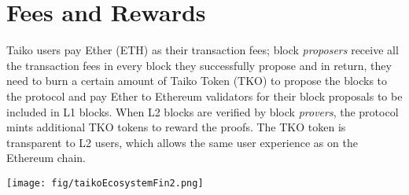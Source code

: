\section{Fees and Rewards}\label{sec:tokenomics}

Taiko users pay Ether (ETH) as their transaction fees; block \emph{proposers} receive all the transaction fees in every block they successfully propose and in return, they need to burn a certain amount of Taiko Token (TKO) to propose the blocks to the protocol and pay Ether to Ethereum validators for their block proposals to be included in L1 blocks. When L2 blocks are verified by block \emph{provers}, the protocol mints additional TKO tokens to reward the proofs. The TKO token is transparent to L2 users, which allows the same user experience as on the Ethereum chain.

\begin{Figure}
 \centering
 \texttt{[image: fig/taikoEcosystemFin2.png]}
 \label{fig:taiExchange}

\end{Figure}


